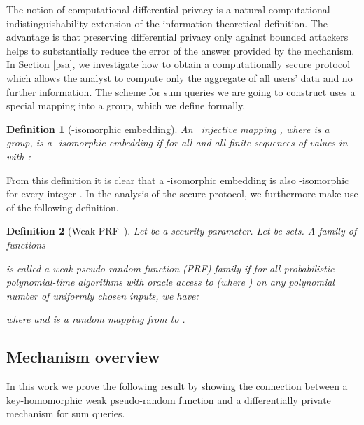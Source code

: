 \documentclass[10pt]{extarticle}
\newtheorem{Def}{Definition}
\begin{document}
The notion of computational differential privacy is a natural computational-\linebreak indistinguishability-extension of the infor\-mation-theoretical definition. The advantage is that preserving differential privacy only against bounded attackers helps to substantially reduce the error of the answer provided by the mechanism. In Section \ref{psa}, we investigate how to obtain a computationally secure protocol which allows the analyst to compute only the aggregate of all users' data and no further information. The scheme for sum queries we are going to construct uses a special mapping into a group, which we define formally.

\begin{Def}[-isomorphic embedding] An \,\,\,injec\-tive mapping , where  is a group, is a -isomorphic embedding if for all  and all finite sequences  of values in  with :

\end{Def}

From this definition it is clear that a -isomorphic embedding is also -isomorphic for every integer . In the analysis of the secure protocol, we furthermore make use of the following definition.

\begin{Def}[Weak PRF~\cite{26}] Let  be a security parameter. Let  be sets. A family of functions 
 
is called a weak pseudo-random function (PRF) family if for all probabilistic polynomial-time algorithms  with oracle access to  (where ) on any polynomial number of uniformly chosen inputs, we have:

where  and  is a random mapping from  to .
\end{Def}



















\subsection{Mechanism overview}\label{mechov}

In this work we prove the following result by showing the connection between a key-homomorphic weak pseudo-random function and a differentially private mechanism for sum queries.
\end{document}
